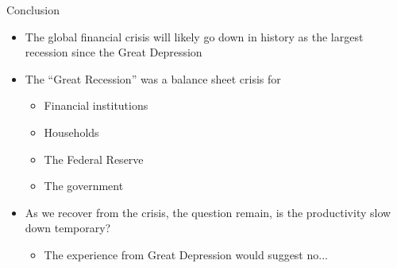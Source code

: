 \documentclass[aspectratio=1610]{beamer}
\begin{document}
\begin{frame}[wide]{Conclusion}
	\begin{itemize}
		\item The global financial crisis will likely go down in history as the largest recession since the Great Depression
		\item The “Great Recession” was a balance sheet crisis for
		\begin{itemize}
			\item Financial institutions
			\item Households
			\item The Federal Reserve
			\item The government
		\end{itemize}
		\item As we recover from the crisis, the question remain, is the productivity slow down temporary?
		\begin{itemize}
			\item The experience from Great Depression would suggest no...
		\end{itemize}
	\end{itemize}
\end{frame}

\end{document}
